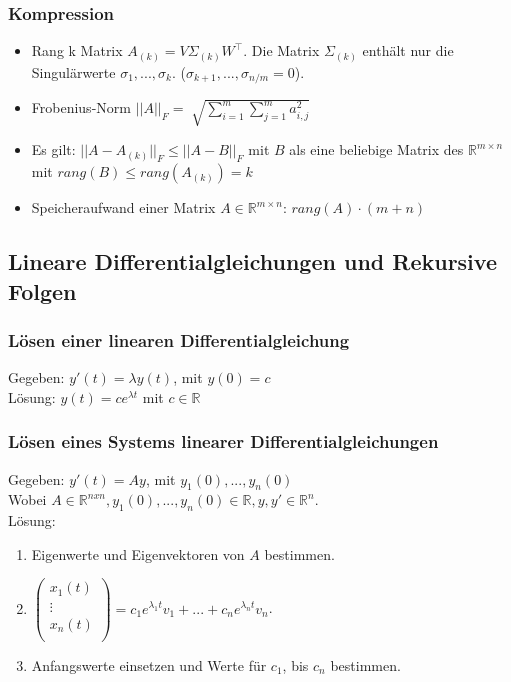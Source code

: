 \documentclass[6pt,a4paper]{scrartcl}
\begin{document}
\begin{multicols*}{4}
\subsubsection{Kompression}
\begin{itemize}\itemsep0pt
\item Rang k Matrix $A_{(k)}=V\Sigma_{(k)}W^\top$. Die Matrix $\Sigma_{(k)}$ enthält nur die Singulärwerte $\sigma_1, ...,\sigma_k$. ($\sigma_{k+1}, ...,\sigma_{n/m}=0$).\\
\item Frobenius-Norm $|| A ||_F = \sqrt[]{\sum_{i=1}^{m} \sum_{j=1}^{m} {a^{2}_{i,j}}}$\\
\item Es gilt: $|| A-A_{(k)} ||_F \leq || A-B ||_F$ mit $B$ als eine beliebige Matrix des $\mathbb{R}^{m\times n}$ mit $rang(B) \leq rang(A_{(k)}) = k$
\item Speicheraufwand einer Matrix $A\in \mathbb{R}^{m\times n}$: $rang(A) \cdot (m+n)$
\end{itemize}
\subsection{Lineare Differentialgleichungen und Rekursive Folgen}
\subsubsection{Lösen einer linearen Differentialgleichung}
Gegeben: $y'(t) = \lambda y(t)$, mit $y(0) = c$\\
Lösung: $y(t) = ce^{\lambda t}$ mit $c \in \mathbb R$\\
\subsubsection{Lösen eines Systems linearer Differentialgleichungen}
Gegeben: $y'(t) = Ay$, mit $y_1(0) , ..., y_n(0)$\\ 
Wobei $A \in \mathbb R^{nxn}, y_1(0) , ..., y_n(0) \in \mathbb R, y,y'\in\mathbb R^n$.\\
Lösung:\\
\begin{enumerate}
	\item Eigenwerte und Eigenvektoren von $A$ bestimmen.
	\item $\begin{pmatrix}
	x_1(t)\\
	\vdots\\
	x_n(t) \\
	\end{pmatrix}
	= c_1e^{\lambda_1t}v_1+...+c_ne^{\lambda_nt}v_n$.
	\item Anfangswerte einsetzen und Werte für $c_1$, bis $c_n$ bestimmen.
\end{enumerate}

\end{multicols*}
\end{document}
